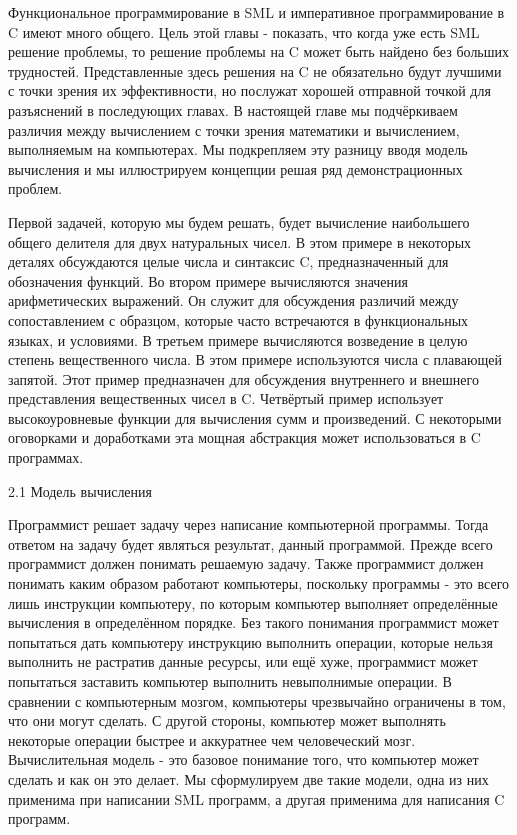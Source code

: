 Функциональное программирование в SML и императивное программирование в C имеют много общего. Цель этой главы - показать, что когда уже есть SML решение проблемы, то решение проблемы на C может быть найдено без больших трудностей. Представленные здесь решения на C не обязательно будут лучшими с точки зрения их эффективности, но послужат хорошей отправной точкой для разъяснений в последующих главах. В настоящей главе мы подчёркиваем различия между вычислением с точки зрения математики и вычислением, выполняемым на компьютерах. Мы подкрепляем эту разницу вводя модель вычисления и мы иллюстрируем концепции решая ряд демонстрационных проблем.

Первой задачей, которую мы будем решать, будет вычисление наибольшего общего делителя для двух натуральных чисел. В этом примере в некоторых деталях обсуждаются целые числа и синтаксис C, предназначенный для обозначения функций. Во втором примере вычисляются значения арифметических выражений. Он служит для обсуждения различий между сопоставлением с образцом, которые часто встречаются в функциональных языках, и условиями. В третьем примере вычисляются возведение в целую степень вещественного числа. В этом примере используются числа с плавающей запятой. Этот пример предназначен для обсуждения внутреннего и внешнего представления вещественных чисел в C. Четвёртый пример использует высокоуровневые функции для вычисления сумм и произведений. С некоторыми оговорками и доработками эта мощная абстракция может использоваться в C программах.

2.1 Модель вычисления

Программист решает задачу через написание компьютерной программы. Тогда ответом на задачу будет являться результат, данный программой. Прежде всего программист должен понимать решаемую задачу. Также программист должен понимать каким образом работают компьютеры, поскольку программы - это всего лишь инструкции компьютеру, по которым компьютер выполняет определённые вычисления в определённом порядке. Без такого понимания программист может попытаться дать компьютеру инструкцию выполнить операции, которые нельзя выполнить не растратив данные ресурсы, или ещё хуже, программист может попытаться заставить компьютер выполнить невыполнимые операции. В сравнении с компьютерным мозгом, компьютеры чрезвычайно ограничены в том, что они могут сделать. С другой стороны, компьютер может выполнять некоторые операции быстрее и аккуратнее чем человеческий мозг. Вычислительная модель - это базовое понимание того, что компьютер может сделать и как он это делает. Мы сформулируем две такие модели, одна из них применима при написании SML программ, а другая применима для написания C программ.

